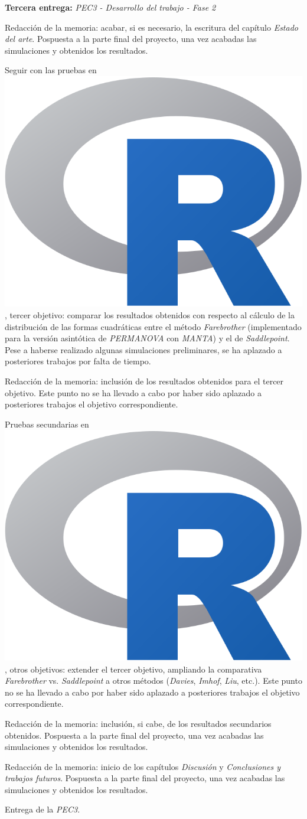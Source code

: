 \documentclass[IB,BIB]{TFUOC}%
\newcommand{\checkbox}{\text{\fboxsep=-.15pt\fbox{\rule{0pt}{1.5ex}\rule{1.5ex}{0pt}}}} %
\newcommand{\cmark}{\ding{51}} %
\newcommand{\xmark}{\ding{55}} %
\newcommand{\progress}{\ding{46}} %
\newcommand{\done}{\rlap{\checkbox}{\raisebox{1.2pt}{\large\hspace{1pt}\cmark}}
\hspace{-2.5pt}}
\newcommand{\wontfix}{\rlap{\checkbox}{\raisebox{-1.5pt}{\large\hspace{-.75pt}\xmark}}
\hspace{-2.5pt}}
\newcommand{\Rlogo}{\protect\includegraphics[height=2.5ex,keepaspectratio]{Rlogo.png}}
\begin{document}
\begin{todolist}
  \item[\done] \textbf{Tercera entrega:} \textit{PEC3 - Desarrollo del trabajo - Fase 2}
  \begin{todolist}
  \item[\progress] Redacción de la memoria: acabar, si es necesario, la escritura del capítulo \textit{Estado del arte}. Pospuesta a la parte final del proyecto, una vez acabadas las simulaciones y obtenidos los resultados.
  \item[\wontfix] Seguir con las pruebas en \hspace{-.2em}\Rlogo\hspace{+.1em}, tercer objetivo: comparar los resultados obtenidos con respecto al cálculo de la distribución de las formas cuadráticas entre el método \textit{Farebrother} (implementado para la versión asintótica de \textit{PERMANOVA} con \textit{MANTA}) y el de \textit{Saddlepoint}. Pese a haberse realizado algunas simulaciones preliminares, se ha aplazado a posteriores trabajos por falta de tiempo.
  \item[\wontfix] Redacción de la memoria: inclusión de los resultados obtenidos para el tercer objetivo. Este punto no se ha llevado a cabo por haber sido aplazado a posteriores trabajos el objetivo correspondiente.
  \item[\wontfix] Pruebas secundarias en \hspace{-.2em}\Rlogo\hspace{+.1em}, otros objetivos: extender el tercer objetivo, ampliando la comparativa \textit{Farebrother} vs. \textit{Saddlepoint} a otros métodos (\textit{Davies}, \textit{Imhof}, \textit{Liu}, etc.). Este punto no se ha llevado a cabo por haber sido aplazado a posteriores trabajos el objetivo correspondiente.
  \item[\wontfix] Redacción de la memoria: inclusión, si cabe, de los resultados secundarios obtenidos. Pospuesta a la parte final del proyecto, una vez acabadas las simulaciones y obtenidos los resultados.
  \item[\progress] Redacción de la memoria: inicio de los capítulos \textit{Discusión} y \textit{Conclusiones y trabajos futuros}. Pospuesta a la parte final del proyecto, una vez acabadas las simulaciones y obtenidos los resultados.
  \item[\done] Entrega de la \textit{PEC3}.
  \end{todolist}
\end{todolist}
\end{document}
